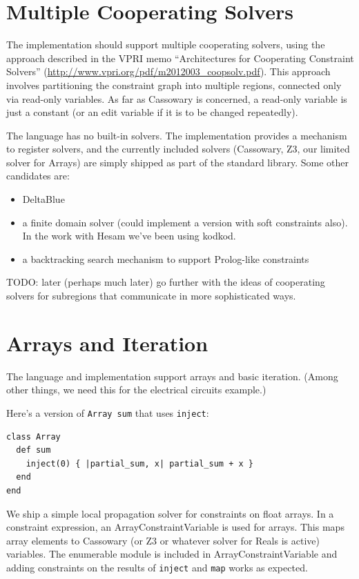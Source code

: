 \documentclass[11pt]{article}
\begin{document}
\section{Multiple Cooperating Solvers}
\label{sec:cooperating-solvers}

The implementation should support multiple cooperating solvers, using
the approach described in the VPRI memo ``Architectures for
Cooperating Constraint Solvers''
(\url{http://www.vpri.org/pdf/m2012003_coopsolv.pdf}).  This approach
involves partitioning the constraint graph into multiple regions,
connected only via read-only variables.  As far as Cassowary is
concerned, a read-only variable is just a constant (or an edit
variable if it is to be changed repeatedly).

The language has no built-in solvers. The implementation provides a
mechanism to register solvers, and the currently included solvers
(Cassowary, Z3, our limited solver for Arrays) are simply shipped as
part of the standard library. Some other candidates are:
\begin{itemize}
\item DeltaBlue
\item a finite domain solver (could implement a version with soft
  constraints also). In the work with Hesam we've been using kodkod.
\item a backtracking search mechanism to support Prolog-like constraints
\end{itemize}

TODO: later (perhaps much later) go further with the ideas of
cooperating solvers for subregions that communicate in more
sophisticated ways.

\section{Arrays and Iteration}
\label{sec:arrays-iteration}

The language and implementation support arrays and basic iteration.
(Among other things, we need this for the electrical circuits
example.)

Here's a version of \lstinline{Array sum} that uses \lstinline{inject}:
\begin{lstlisting}
class Array
  def sum
    inject(0) { |partial_sum, x| partial_sum + x }
  end
end
\end{lstlisting}

We ship a simple local propagation solver for constraints on float
arrays. In a constraint expression, an ArrayConstraintVariable is used
for arrays. This maps array elements to Cassowary (or Z3 or whatever
solver for Reals is active) variables. The enumerable module is
included in ArrayConstraintVariable and adding constraints on the
results of \lstinline{inject} and \lstinline{map} works as expected.
\end{document}
